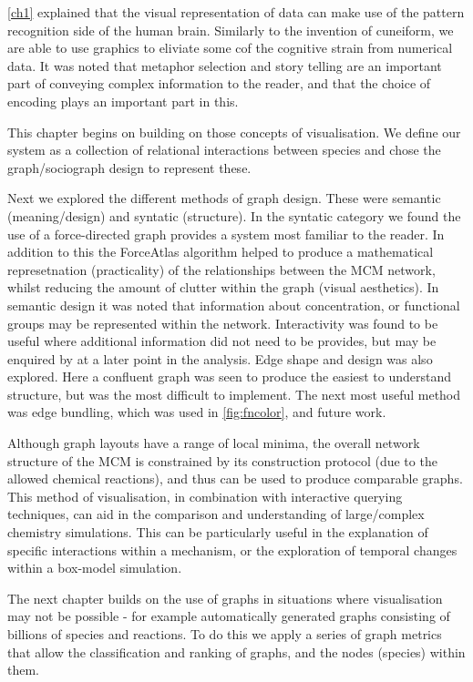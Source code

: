 \autoref{ch1} explained that the visual representation of data can make use of the pattern recognition side of the human brain. Similarly to the invention of cuneiform, we are able to use graphics to eliviate some cof the cognitive strain from numerical data. It was noted that metaphor selection and story telling are an important part of conveying complex information to the reader, and that the choice of encoding plays an important part in this. 

This chapter begins on building on those concepts of visualisation. We define our system as a collection of relational interactions between species and chose the graph/sociograph design to represent these. 

Next we explored the different methods of graph design. These were semantic (meaning/design) and syntatic (structure). In the syntatic category we found the use of a force-directed graph provides a system most familiar to the reader. In addition to this the ForceAtlas algorithm helped to produce a mathematical represetnation (practicality) of the relationships between the MCM network, whilst reducing the amount of clutter within the graph (visual aesthetics). In semantic design it was noted that information about concentration, or functional groups may be represented within the network. Interactivity was found to be useful where additional information did not need to be provides, but may be enquired by at a later point in the analysis. Edge shape and design was also explored. Here a confluent graph was seen to produce the easiest to understand structure, but was the most difficult to implement. The next most useful method was edge bundling, which was used in \autoref{fig:fncolor}, and future work.

Although graph layouts have a range of local minima, the overall network structure of the MCM is constrained by its construction protocol (due to the allowed chemical reactions), and thus can be used to produce comparable graphs. This method of visualisation, in combination with interactive querying techniques, can aid in the comparison and understanding of large/complex chemistry simulations. This can be particularly useful in the explanation of specific interactions within a mechanism, or the exploration of temporal changes within a box-model simulation. 

The next chapter builds on the use of graphs in situations where visualisation may not be possible - for example automatically generated graphs consisting of billions of species and reactions. To do this we apply a series of graph metrics that allow the classification and ranking of graphs, and the nodes (species) within them.